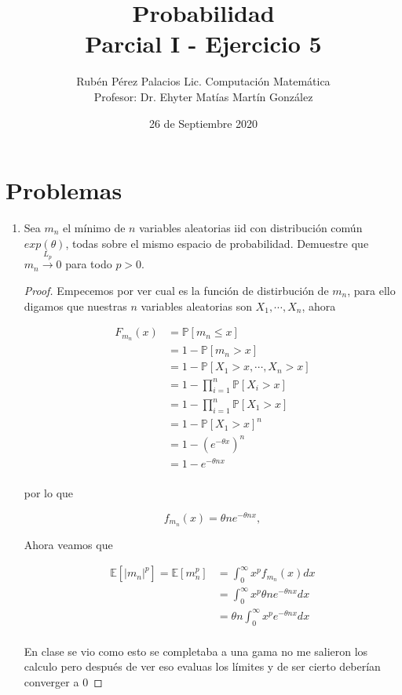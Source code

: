 \documentclass[letterpaper]{article}
\title{Probabilidad \\Parcial I - Ejercicio 5}
\author{Rubén Pérez Palacios Lic. Computación Matemática\\Profesor: Dr. Ehyter Matías Martín González}
\date{26 de Septiembre 2020}
\newcommand{\pars}[1]{\left( #1 \right) }
\newcommand{\bracs}[1]{\left[ #1 \right] }
\newcommand{\1}{\mathbbm{1}}
\begin{document}
	\maketitle
    
    \section*{Problemas}

    \begin{enumerate}

		\item Sea $m_n$ el mínimo de $n$ variables aleatorias iid con distribución común $exp(\theta)$, todas sobre el mismo espacio de probabilidad. Demuestre que $m_n\overset{L_p}{\to}0$ para todo $p>0$.
		
		\begin{proof}
			Empecemos por ver cual es la función de distirbución de $m_n$, para ello digamos que nuestras $n$ variables aleatorias son $X_1,\cdots,X_n$, ahora

			\begin{align*}
				F_{m_n}(x) &= \mathbb{P}\bracs{m_n \leq x}\\
				&= 1 - \mathbb{P}\bracs{m_n > x}\\
				&= 1 - \mathbb{P}\bracs{X_1 > x, \cdots, X_n > x}\\
				&= 1 - \prod_{i=1}^n \mathbb{P}\bracs{X_i > x}\\
				&= 1 - \prod_{i=1}^n \mathbb{P}\bracs{X_1 > x}\\
				&= 1 - \mathbb{P}\bracs{X_1 > x}^n\\
				&= 1 - \pars{e^{-\theta x}}^n\\
				&= 1 - e^{-\theta n x}\\
			\end{align*}

			por lo que

			\[f_{m_n}(x) = \theta n e^{-\theta n x},\]

			Ahora veamos que

			\begin{align*}
				\mathbb{E}\bracs{|m_n|^p} = \mathbb{E}\bracs{m_n^p}
				&= \int_{0}^{\infty} x^p f_{m_n}(x) dx\\
				&= \int_{0}^{\infty} x^p \theta n e^{-\theta n x} dx\\
				&= \theta n \int_{0}^{\infty} x^p e^{-\theta n x} dx\\
			\end{align*}

			En clase se vio como esto se completaba a una gama no me salieron los calculo pero después de ver eso evaluas los límites y de ser cierto deberían converger a 0

		\end{proof}

    \end{enumerate}

	
\end{document}
